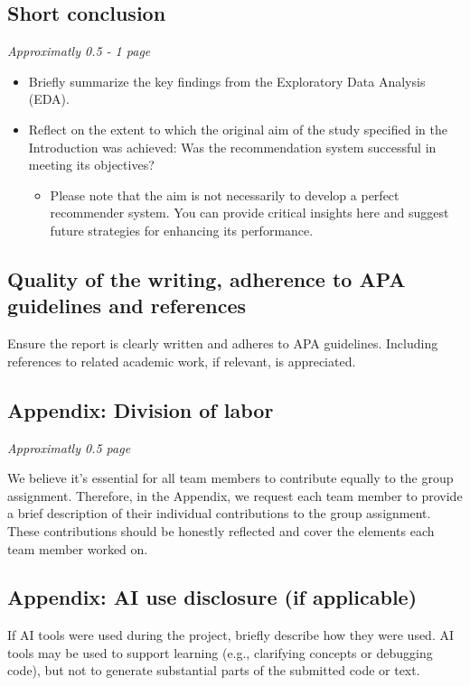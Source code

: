 \subsection{Short conclusion}

\textit{Approximatly 0.5 - 1 page}

\begin{itemize}
	\item Briefly summarize the key findings from the Exploratory Data Analysis (EDA).
	\item Reflect on the extent to which the original aim of the study specified in the Introduction was achieved: Was the recommendation system successful in meeting its objectives?
	\begin{itemize}
	\item Please note that the aim is not necessarily to develop a perfect recommender system. You can provide critical insights here and suggest future strategies for enhancing its performance.
\end{itemize}
\end{itemize}

\subsection{Quality of the writing, adherence to APA guidelines and references}

Ensure the report is clearly written and adheres to APA guidelines. Including references to related academic work, if relevant, is appreciated.

\subsection{Appendix: Division of labor}

\textit{Approximatly 0.5 page}

We believe it's essential for all team members to contribute equally to the group assignment. 
Therefore, in the Appendix, we request each team member to provide a brief description of their individual contributions to the group assignment. These contributions should be honestly reflected and cover the elements each team member worked on.

\subsection{Appendix: AI use disclosure (if applicable)}

If AI tools were used during the project, briefly describe how they were used. 
AI tools may be used to support learning (e.g., clarifying concepts or debugging code), but not to generate substantial parts of the submitted code or text.

